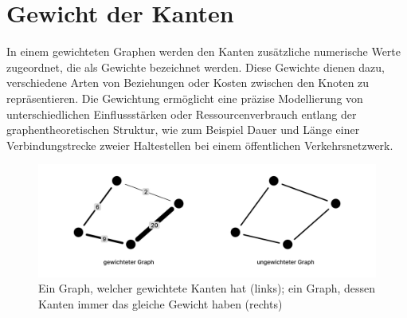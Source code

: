 \section{Gewicht der Kanten}

In einem gewichteten Graphen werden den Kanten zusätzliche numerische Werte zugeordnet, die als Gewichte bezeichnet werden. Diese Gewichte dienen dazu, verschiedene Arten von Beziehungen oder Kosten zwischen den Knoten zu repräsentieren. Die Gewichtung ermöglicht eine präzise Modellierung von unterschiedlichen Einflussstärken oder Ressourcenverbrauch entlang der graphentheoretischen Struktur, wie zum Beispiel Dauer und Länge einer Verbindungstrecke zweier Haltestellen bei einem öffentlichen Verkehrsnetzwerk. \cite{ohlbach2018graphen}

\begin{figure}
    \centering
    \includegraphics[width=1\textwidth]{content/img/Research/Graphen/Gewicht.png}
    \caption{Ein Graph, welcher gewichtete Kanten hat (links); ein Graph, dessen Kanten immer das gleiche Gewicht haben (rechts)}
    \label{fig:gewicht}
\end{figure}
\FloatBarrier